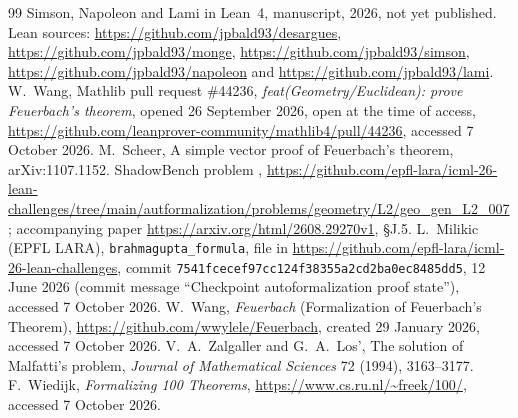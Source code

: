 \documentclass[11pt]{article}
\theoremstyle{definition}
\theoremstyle{remark}
\newcommand{\lean}[1]{\texttt{#1}}
\begin{document}
\begin{thebibliography}{99}
Simson, Napoleon and Lami in Lean~4, manuscript, 2026, not yet published. Lean sources:
\url{https://github.com/jpbald93/desargues}, \url{https://github.com/jpbald93/monge},
\url{https://github.com/jpbald93/simson}, \url{https://github.com/jpbald93/napoleon} and
\url{https://github.com/jpbald93/lami}.
 W.~Wang, Mathlib pull request \#44236, \emph{feat(Geometry/Euclidean): prove
Feuerbach's theorem}, opened 26 September 2026, open at the time of access,
\url{https://github.com/leanprover-community/mathlib4/pull/44236}, accessed 7 October 2026.
 M.~Scheer, A simple vector proof of Feuerbach's theorem, arXiv:1107.1152.
 ShadowBench problem ,
\url{https://github.com/epfl-lara/icml-26-lean-challenges/tree/main/autformalization/problems/geometry/L2/geo_gen_L2_007};
accompanying paper \url{https://arxiv.org/html/2608.29270v1}, \S J.5.
 L.~Milikic (EPFL LARA), \lean{brahmagupta\_formula}, file
 in
\url{https://github.com/epfl-lara/icml-26-lean-challenges}, commit
\texttt{7541fcecef97cc124f38355a2cd2ba0ec8485dd5}, 12 June 2026 (commit message ``Checkpoint
autoformalization proof state''), accessed 7 October 2026.
 W.~Wang, \emph{Feuerbach} (Formalization of Feuerbach's Theorem),
\url{https://github.com/wwylele/Feuerbach}, created 29 January 2026, accessed 7 October 2026.
 V.~A.~Zalgaller and G.~A.~Los', The solution of Malfatti's problem,
\emph{Journal of Mathematical Sciences} 72 (1994), 3163--3177.
 F.~Wiedijk, \emph{Formalizing 100 Theorems},
\url{https://www.cs.ru.nl/~freek/100/}, accessed 7 October 2026.
\end{thebibliography}
\end{document}
